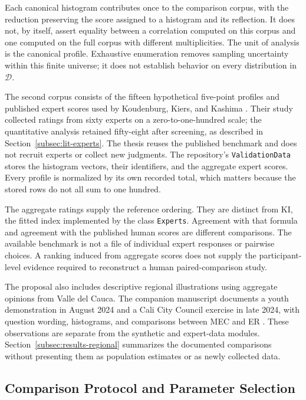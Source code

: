 \documentclass{article}
\theoremstyle{plain}
\theoremstyle{remark}
\begin{document}
Each canonical histogram contributes once to the comparison corpus, with the reduction preserving the score assigned to a histogram and its reflection. It does not, by itself, assert equality between a correlation computed on this corpus and one computed on the full corpus with different multiplicities. The unit of analysis is the canonical profile. Exhaustive enumeration removes sampling uncertainty within this finite universe; it does not establish behavior on every distribution in $\mathcal{D}$.

The second corpus consists of the fifteen hypothetical five-point profiles and published expert scores used by Koudenburg, Kiers, and Kashima \citep{koudenburg2021new,aranda2026mec}. Their study collected ratings from sixty experts on a zero-to-one-hundred scale; the quantitative analysis retained fifty-eight after screening, as described in Section~\ref{subsec:lit-experts}. The thesis reuses the published benchmark and does not recruit experts or collect new judgments. The repository's \texttt{ValidationData} stores the histogram vectors, their identifiers, and the aggregate expert scores. Every profile is normalized by its own recorded total, which matters because the stored rows do not all sum to one hundred.

The aggregate ratings supply the reference ordering. They are distinct from KI, the fitted index implemented by the class \texttt{Experts}. Agreement with that formula and agreement with the published human scores are different comparisons. The available benchmark is not a file of individual expert responses or pairwise choices. A ranking induced from aggregate scores does not supply the participant-level evidence required to reconstruct a human paired-comparison study.

The proposal also includes descriptive regional illustrations using aggregate opinions from Valle del Cauca. The companion manuscript documents a youth demonstration in August 2024 and a Cali City Council exercise in late 2024, with question wording, histograms, and comparisons between MEC and ER \citep[Section~12]{arandaMECcompanion}. These observations are separate from the synthetic and expert-data modules. Section~\ref{subsec:results-regional} summarizes the documented comparisons without presenting them as population estimates or as newly collected data.

\subsection{Comparison Protocol and Parameter Selection}\label{subsec:methods-comparison}
\end{document}
